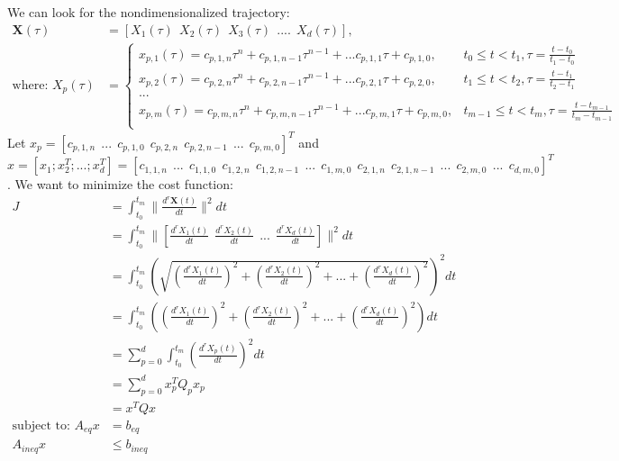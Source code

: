 \documentclass[11pt]{article}
\begin{document}
\mbox{} \newline
We can look for the nondimensionalized trajectory: 
\begin{align*}
\mathbf{X} (\tau) &= [X_1(\tau) \ \ X_2(\tau) \ \ X_3(\tau) \ \ .... \ \ X_d(\tau) ], \\
\text{where: } X_p(\tau) &= 
\begin{cases}
    x_{p, 1} (\tau) = c_{p, 1, n} \tau^n + c_{p, 1, n-1} \tau^{n-1} + ... c_{p, 1, 1} \tau + c_{p, 1, 0}, & t_0 \le t < t_1, \tau = \frac{t-t_0}{t_1-t_0} \\
    x_{p, 2} (\tau) = c_{p, 2, n} \tau^n + c_{p, 2, n-1} \tau^{n-1} + ... c_{p, 2, 1} \tau + c_{p, 2, 0}, & t_1 \le t < t_2, \tau = \frac{t-t_1}{t_2-t_1} \\
    ... \\
    x_{p, m} (\tau) = c_{p, m, n} \tau^n + c_{p, m, n-1} \tau^{n-1} + ... c_{p, m, 1} \tau + c_{p, m, 0}, & t_{m-1} \le t < t_m, \tau = \frac{t-t_{m-1}}{t_m-t_{m-1}} \\
\end{cases}
\end{align*} 
Let $x_p = [c_{p, 1, n} \ \ ... \ \ c_{p, 1, 0} \ \ c_{p, 2, n} \ \ c_{p, 2, n-1} \ \ ... \ \ c_{p, m, 0}]^T$ and $x = [x_1; x_2^T; ...; x_d^T] = [c_{1, 1, n} \ \ ... \ \ c_{1, 1, 0} \ \ c_{1, 2, n} \ \ c_{1, 2, n-1} \ \ ... \ \ c_{1, m, 0} \ \ c_{2, 1, n} \ \ c_{2, 1, n-1} \ \ ... \ \ c_{2, m, 0} \ \ ... \ \ c_{d, m, 0} ]^T$. We want to minimize the cost function:
\begin{align*}
J &= \int_{t_0}^{t_m} \|  \frac{d^{r} \mathbf{X} (t) }{dt} \|^2 dt \\
&=  \int_{t_0}^{t_m} \|  [ \frac{d^{r} {X}_1(t) }{dt} \ \  \frac{d^{r} {X}_2(t) }{dt} \ \ ... \ \  \frac{d^{r} {X}_d(t) }{dt}] \|^2 dt \\
&= \int_{t_0}^{t_m}  \left( \sqrt{  \left( \frac{d^{r} {X}_1(t) }{dt} \right)^2 + \left(  \frac{d^{r} {X}_2(t) }{dt} \right)^2 + ... + \left( \frac{d^{r} {X}_d(t) }{dt}\right) ^2 } \right) ^2 dt \\
&= \int_{t_0}^{t_m} \left( \left( \frac{d^{r} {X}_1(t) }{dt} \right)^2 + \left(  \frac{d^{r} {X}_2(t) }{dt} \right)^2 + ... + \left( \frac{d^{r} {X}_d(t) }{dt}\right) ^2 \right) dt \\
&= \sum_{p = 0}^{d} \int_{t_0}^{t_m} \left( \frac{d^{r} {X}_p(t) }{dt}\right) ^2 dt \\
&= \sum_{p = 0}^{d} x_p^T Q_p x_p \\
&= x^T Q x \\
\text{subject to: } A_{eq} x &= b_{eq} \\
A_{ineq} x &\le b_{ineq}
\end{align*}
\end{document}
